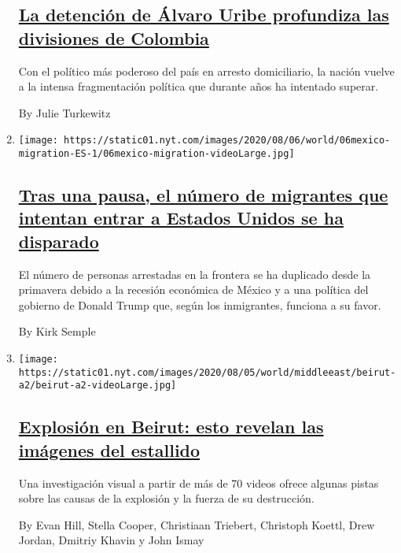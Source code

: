 \begin{enumerate}
{  \subsection{\texorpdfstring{\href{/es/2020/08/07/espanol/america-latina/alvaro-uribe-colombia.html}{La
  detención de Álvaro Uribe profundiza las divisiones de
  Colombia}}{La detención de Álvaro Uribe profundiza las divisiones de Colombia}}\label{la-detenciuxf3n-de-uxe1lvaro-uribe-profundiza-las-divisiones-de-colombia}}

  Con el político más poderoso del país en arresto domiciliario, la
  nación vuelve a la intensa fragmentación política que durante años ha
  intentado superar.

  By Julie Turkewitz
\item
  \texttt{[image: https://static01.nyt.com/images/2020/08/06/world/06mexico-migration-ES-1/06mexico-migration-videoLarge.jpg]}

  \hypertarget{tras-una-pausa-el-nuxfamero-de-migrantes-que-intentan-entrar-a-estados-unidos-se-ha-disparado}{%
  \subsection{\texorpdfstring{\href{/es/2020/08/06/espanol/america-latina/migracion-estados-unidos.html}{Tras
  una pausa, el número de migrantes que intentan entrar a Estados Unidos
  se ha
  disparado}}{Tras una pausa, el número de migrantes que intentan entrar a Estados Unidos se ha disparado}}\label{tras-una-pausa-el-nuxfamero-de-migrantes-que-intentan-entrar-a-estados-unidos-se-ha-disparado}}

  El número de personas arrestadas en la frontera se ha duplicado desde
  la primavera debido a la recesión económica de México y a una política
  del gobierno de Donald Trump que, según los inmigrantes, funciona a su
  favor.

  By Kirk Semple
\item
  \texttt{[image: https://static01.nyt.com/images/2020/08/05/world/middleeast/beirut-a2/beirut-a2-videoLarge.jpg]}

  \hypertarget{explosiuxf3n-en-beirut-esto-revelan-las-imuxe1genes-del-estallido}{%
  \subsection{\texorpdfstring{\href{/es/2020/08/06/espanol/mundo/beirut-video-explosion-libano.html}{Explosión
  en Beirut: esto revelan las imágenes del
  estallido}}{Explosión en Beirut: esto revelan las imágenes del estallido}}\label{explosiuxf3n-en-beirut-esto-revelan-las-imuxe1genes-del-estallido}}

  Una investigación visual a partir de más de 70 videos ofrece algunas
  pistas sobre las causas de la explosión y la fuerza de su destrucción.

  By Evan Hill, Stella Cooper, Christiaan Triebert, Christoph Koettl,
  Drew Jordan, Dmitriy Khavin y John Ismay
\end{enumerate}

